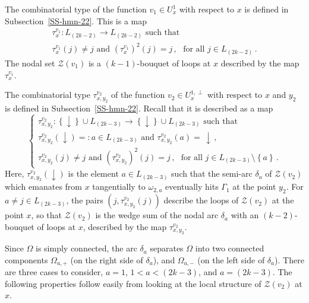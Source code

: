\documentclass[12pt,a4paper]{amsart}
\theoremstyle{plain} %
\theoremstyle{definition}
\numberwithin{equation}{section}
\numberwithin{figure}{section}
\numberwithin{table}{section}
\newcommand{\cZ}{\mathcal{Z}}
\newcommand{\sm}{\!\setminus\!}
\newcommand{\set}[1]{\left\lbrace #1 \right\rbrace}
\begin{document}
{The combinatorial type of the function $v_1 \in U^1_x$ with respect to $x$ is defined in Subsection~\ref{SS-hmn-22}. This is a map
%
\begin{equation}\label{E-hmn-206a}
\begin{array}{l}
\tau_{x}^{v_1} : L_{(2k-2)} \to L_{(2k-2)} \text{~such that}\\[5pt]
\tau_{x}^{v_1}(j) \not = j \text{~and~} (\tau_{x}^{v_1})^2(j) = j\,,
\text{~~for all~} j \in L_{(2k-2)}\,.
\end{array}%
\end{equation}
%
The nodal set $\cZ(v_1)$ is a $(k-1)$-bouquet of loops at $x$ described by the map $\tau_{x}^{v_1}$.\medskip

The combinatorial type $\tau_{x,y_2}^{v_2}$ of the function $v_2 \in U^{1,\perp}_x$ with respect to $x$ and $y_2$ is defined in Subsection~\ref{SS-hmn-22}. Recall that it is described as a map
%
\begin{equation}\label{E-hmn- 206b}
\left\{
\begin{array}{l}
\tau_{x,y_2}^{v_2} : \set{\downarrow} \cup L_{(2k-3)} \to \set{\downarrow} \cup  L_{(2k-3)} \text{~such that}\\[5pt]
\tau_{x,y_2}^{v_2}(\downarrow) =: a \in L_{(2k-3)} \text{~and~}
\tau_{x,y_2}^{v_2}(a) = \, \downarrow\,,\\[5pt]
\tau_{x,y_2}^{v_2}(j) \not = j \text{~and~} (\tau_{x,y_2}^{v_2})^2(j) = j\,,
\text{~~for all~} j \in L_{(2k-3)}\sm \set{a}\,.
\end{array}%
\right.
\end{equation}
%
Here, $\tau_{x,y_2}^{v_2}(\downarrow)$ is the element $a \in L_{(2k-3)}$ such that the semi-arc $\delta_a$ of $\cZ(v_2)$ which emanates from $x$ tangentially to $\omega_{2,a}$ eventually hits $\Gamma_1$ at the point $y_2$. For $a \neq j \in L_{(2k-3)}$,  the pairs $\left( j, \tau_{x,y_2}^{v_2}(j)\right)$ describe the loops of $\cZ(v_2)$ at the point $x$, so that $\cZ(v_2)$ is the wedge sum of the nodal arc $\delta_a$ with an $(k-2)$-bouquet of loops at $x$, described by the map $\tau_{x,y_2}^{v_2}$. \smallskip

Since $\Omega$ is simply connected, the arc $\delta_a$ separates $\Omega$ into
two connected components $\Omega_{a,+}$ (on the right side of $\delta_a$),
and $\Omega_{a,-}$ (on the left side of $\delta_a$). There are three cases to consider, $a = 1$, $1 < a < (2k-3)$, and $a = (2k-3)$. The following properties follow easily from looking at the local structure of $\cZ(v_2)$ at $x$.

}
\end{document}
